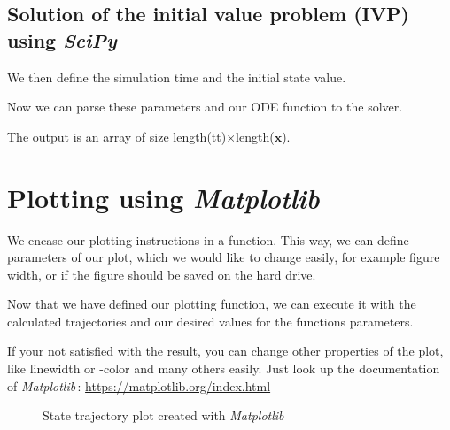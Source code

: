 \documentclass[a4paper,11pt,headings=standardclasses]{scrartcl}%
\newcommand{\scipy}{\emph{SciPy}\,}
\newcommand{\mpl}{\emph{Matplotlib}\,}
\newcommand{\x}{\mathbf{x}}
\begin{document}
\subsection{Solution of the initial value problem (IVP) using \scipy}
We then define the simulation time and the initial state value.

Now we can parse these parameters and our ODE function to the solver.

The output is an array of size length(tt)$\times$length($\x$).

\section{Plotting using \mpl}
\label{sec:plot}
We encase our plotting instructions in a function. This way, we can define parameters of our plot, which we would like to change easily, for example figure width, or if the figure should be saved on the hard drive.

Now that we have defined our plotting function, we  can execute it with the calculated trajectories and our desired values for the functions parameters.

If your not satisfied with the result, you can change other properties of the plot, like linewidth or -color and many others easily. Just look up the documentation of \mpl : \url{https://matplotlib.org/index.html}
\begin{figure}[h]
\label{fig:state_traj}
   \centering      
         
 \caption{State trajectory plot created with \mpl}
 \label{fig:Test}
\end{figure} 
\newpage
\end{document}
